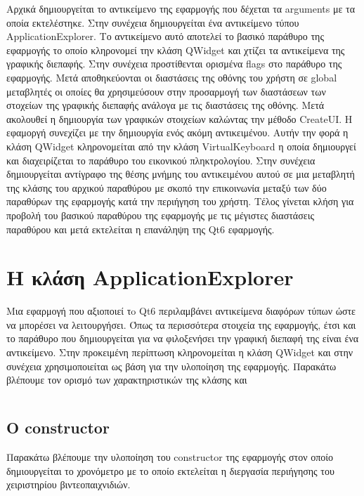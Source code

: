 Αρχικά δημιουργείται το αντικείμενο της εφαρμογής που δέχεται τα arguments με τα οποία εκτελέστηκε.
Στην συνέχεια δημιουργείται ένα αντικείμενο τύπου ApplicationExplorer. Το αντικείμενο αυτό αποτελεί
το βασικό παράθυρο της εφαρμογής το οποίο κληρονομεί την κλάση QWidget και χτίζει τα αντικείμενα της
γραφικής διεπαφής. Στην συνέχεια προστίθενται ορισμένα flags στο παράθυρο της εφαρμογής. Μετά αποθηκεύονται
οι διαστάσεις της οθόνης του χρήστη σε global μεταβλητές οι οποίες θα χρησιμεύσουν στην προσαρμογή των
διαστάσεων των στοχείων της γραφικής διεπαφής ανάλογα με τις διαστάσεις της οθόνης. Μετά ακολουθεί η
δημιουργία των γραφικών στοιχείων καλώντας την μέθοδο CreateUI. Η εφαμοργή συνεχίζει με την δημιουργία
ενός ακόμη αντικειμένου. Αυτήν την φορά η κλάση QWidget κληρονομείται από την κλάση VirtualKeyboard
η οποία δημιουργεί και διαχειρίζεται το παράθυρο του εικονικού πληκτρολογίου. Στην συνέχεια δημιουργείται
αντίγραφο της θέσης μνήμης του αντικειμένου αυτού σε μια μεταβλητή της κλάσης του αρχικού παραθύρου με
σκοπό την επικοινωνία μεταξύ των δύο παραθύρων της εφαρμογής κατά την περιήγηση του χρήστη. Τέλος γίνεται
κλήση για προβολή του βασικού παραθύρου της εφαρμογής με τις μέγιστες διαστάσεις παραθύρου και μετά
εκτελείται η επανάληψη της Qt6 εφαρμογής. 


\section{Η κλάση ApplicationExplorer}


Μια εφαρμογή που αξιοποιεί τo Qt6 περιλαμβάνει αντικείμενα διαφόρων τύπων ώστε να
μπορέσει να λειτουργήσει. Όπως τα περισσότερα στοιχεία της εφαρμογής, έτσι και το
παράθυρο που δημιουργείται για να φιλοξενήσει την γραφική διεπαφή της είναι ένα αντικείμενο. 
Στην προκειμένη περίπτωση κληρονομείται η κλάση QWidget και στην συνέχεια χρησιμοποιείται 
ως βάση για την υλοποίηση της εφαρμογής. Παρακάτω βλέπουμε τον ορισμό των χαρακτηριστικών
της κλάσης και 


\begin{lstlisting}[language=C++, style=cppstyle]

\end{lstlisting}





\subsection{Ο constructor}
Παρακάτω βλέπουμε την υλοποίηση του constructor της εφαρμογής στον οποίο δημιουργείται 
το χρονόμετρο με το οποίο εκτελείται η διεργασία περιήγησης του χειριστηρίου βιντεοπαιχνιδιών.

